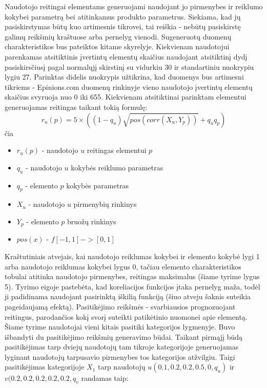 \documentclass{VUMIFInfMagistrinis}
\begin{document}
\indent
Naudotojo reitingai elementams generuojami naudojant jo pirmenybes ir reiklumo kokybei parametrą bei atitinkamus produkto parametrus. Siekiama, kad jų pasiskirstymas būtų kuo artimesnis tikrovei, tai reiškia - nebūtų pasiskirstę galimų reikšmių kraštuose arba pernelyg vienodi. Sugeneruotų duomenų charakteristikos bus pateiktos kitame skyrelyje. 
\newline
\indent
Kiekvienam naudotojui parenkamas atsitiktinis įvertintų elementų skaičius naudojant atsitiktinį dydį pasiskirsčiusį pagal normalųjį skirstinį su vidurkiu 30 ir standartiniu nuokrypiu lygiu 27. Parinktas didelis nuokrypis užtikrina, kad duomenys bus artimesni tikriems - Epinions.com duomenų rinkinyje vieno naudotojo įvertintų elementų skaičius svyruoja nuo 0 iki 655. Kiekvienam atsitiktinai parinktam elementui generuojamas reitingas taikant tokią formulę:
\begin{equation}
r_u(p) = 5 \times ((1-q_u) \sqrt{pos(corr(X_u,Y_p))} + q_u q_p)
\end{equation}
čia
\begin{itemize}
	\item $r_u(p)$ - naudotojo $u$ reitingas elementui $p$
	\item $q_u$ - naudotojo $u$ kokybės reiklumo parametras
	\item $q_p$ - elemento $p$ kokybės parametras
	\item $X_u$ - naudotojo $u$ pirmenybių rinkinys 
	\item $Y_p$ - elemento $p$ bruožų rinkinys
	\item $pos(x)$ - $f[-1,1] -> [0,1]$
\end{itemize}
\indent
Kraštutiniais atvejais, kai naudotojo reiklumas kokybei ir elemento kokybė lygi 1 arba naudotojo reiklumas kokybei lygus 0, tačiau elemento charakteristikos tobulai atitinka naudotojo pirmenybes, reitingas maksimalus (šiame tyrime lygus 5). Tyrimo eigoje pastebėta, kad koreliacijos funkcijos įtaka pernelyg maža, todėl ji padidinama naudojant pasirinktą iškilią funkciją (šiuo atveju šaknis suteikia pageidaujamą efektą).
\indent
Pasitikėjimo reikšmės - svarbiausios prognozuojant reitingus, parodančios kokį svorį suteikti patikėtinio nuomonei apie elementą. Šiame tyrime naudotojai vieni kitais pasitiki kategorijos lygmenyje. Buvo išbandyti du pasitikėjimo reikšmių generavimo būdai.
\newline
\indent
Taikant pirmąjį būdą pasitikėjimas tarp dviejų naudotojų tam tikroje kategorijoje generuojamas lyginant naudotojų tarpusavio pirmenybes tos kategorijos atžvilgiu. Taigi pasitikėjimas kategorijoje $X_1$ tarp naudotojų $u(0.1, 0.2, 0.2, 0.5, 0, q_u)$ ir $v(0.2, 0.2, 0.2, 0.2, 0.2, q_v$ randamas taip:
\end{document}
